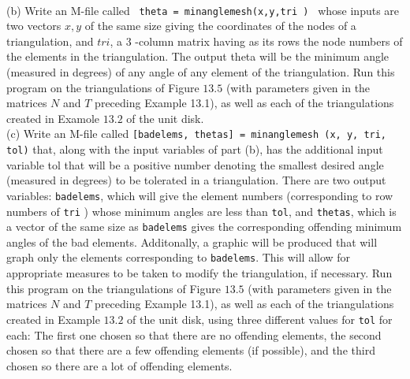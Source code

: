\documentclass[../main.tex]{subfiles}
\begin{document}
\begin{enumerate}
\\
(b) Write an M-file called \texttt{ theta = minanglemesh(x,y,tri ) } whose inputs are two vectors $x, y$ of the same size giving the coordinates of the nodes of a triangulation, and $t r i$, a 3 -column matrix having as its rows the node numbers of the elements in the triangulation. The output theta will be the minimum angle (measured in degrees) of any angle of any element of the triangulation. Run this program on the triangulations of Figure $13.5$ (with parameters given in the matrices $N$ and $T$ preceding Example 13.1), as well as each of the triangulations created in Examole $13.2$ of the unit disk.
\\
(c) Write an M-file called \texttt{[badelems, thetas] = minanglemesh (x, y, tri, tol)} that, along with the input variables of part (b), has the additional input variable tol that will be a positive number denoting the smallest desired angle (measured in degrees) to be tolerated in a triangulation. There are two output variables: \texttt{badelems}, which will give the element numbers (corresponding to row numbers of \texttt{tri} ) whose minimum angles are less than \texttt{tol}, and \texttt{thetas}, which is a vector of the same size as \texttt{badelems} gives the corresponding offending minimum angles of the bad elements. Additonally, a graphic will be produced that will graph only the elements corresponding to \texttt{badelems}. This will allow for appropriate measures to be taken to modify the triangulation, if necessary. Run this program on the triangulations of Figure $13.5$ (with parameters given in the matrices $N$ and $T$ preceding Example 13.1), as well as each of the triangulations created in Example $13.2$ of the unit disk, using three different values for \texttt{tol} for each: The first one chosen so that there are no offending elements, the second chosen so that there are a few offending elements (if possible), and the third chosen so there are a lot of offending elements.
\end{enumerate}
\end{document}

